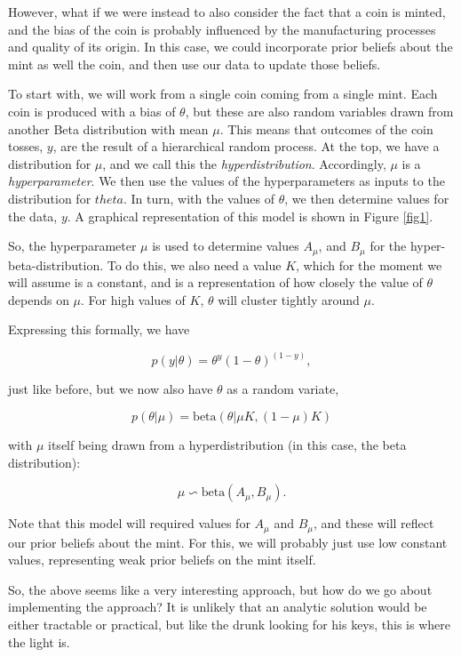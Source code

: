 \documentclass[10pt, a4paper]{article}
\begin{document}
However, what if we were instead to also consider the fact that a coin
is minted, and the bias of the coin is probably influenced by the
manufacturing processes and quality of its origin. In this case, we
could incorporate prior beliefs about the mint as well the coin, and
then use our data to update those beliefs.

To start with, we will work from a single coin coming from a single
mint. Each coin is produced with a bias of $\theta$, but these are
also random variables drawn from another Beta distribution with mean
$\mu$. This means that outcomes of the coin tosses, $y$, are the
result of a hierarchical random process. At the top, we have a
distribution for $\mu$, and we call this the
\emph{hyperdistribution}. Accordingly, $\mu$ is a
\emph{hyperparameter}. We then use the values of the hyperparameters
as inputs to the distribution for $theta$. In turn, with the values of
$\theta$, we then determine values for the data, $y$. A graphical
representation of this model is shown in Figure \ref{fig1}.

So, the hyperparameter $\mu$ is used to determine values $A_\mu$, and
$B_\mu$ for the hyper-beta-distribution. To do this, we also need a
value $K$, which for the moment we will assume is a constant, and is a
representation of how closely the value of $\theta$ depends on
$\mu$. For high values of $K$, $\theta$ will cluster tightly around
$\mu$.

Expressing this formally, we have

\[ p(y|\theta) = \theta^y (1 - \theta)^{(1-y)} , \]

\noindent
just like before, but we now also have $\theta$ as a random variate,

\[ p(\theta | \mu) = \text{beta}(\theta | \mu K, (1 - \mu) K) \]

\noindent
with $\mu$ itself being drawn from a hyperdistribution (in this case, the
beta distribution):

\[ \mu \backsim \text{beta}(A_\mu, B_\mu). \]

Note that this model will required values for $A_\mu$ and $B_\mu$, and
these will reflect our prior beliefs about the mint. For this, we will
probably just use low constant values, representing weak prior beliefs
on the mint itself.

So, the above seems like a very interesting approach, but how do we go
about implementing the approach? It is unlikely that an analytic
solution would be either tractable or practical, but like the drunk
looking for his keys, this is where the light is.
\end{document}

